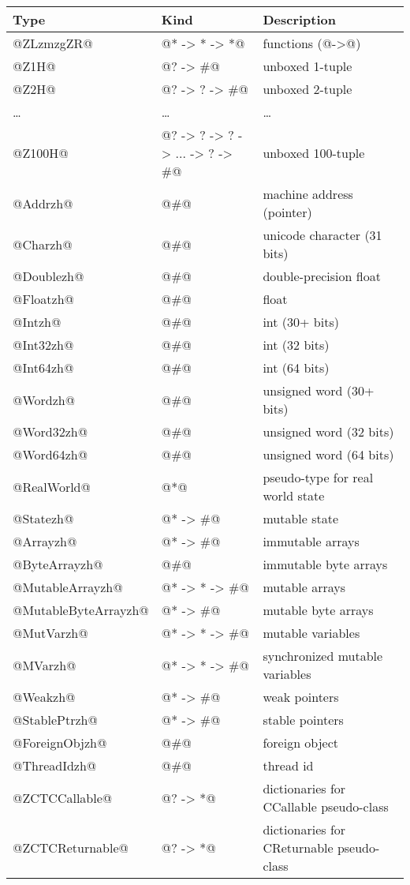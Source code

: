 \documentclass[10pt]{article}
\begin{document}
\begin{tabular}{|l|l|l|}
\hline
Type & Kind & Description \\
\hline
@ZLzmzgZR@ & @* -> * -> *@ & functions (@->@) \\
@Z1H@ & @? -> #@    & unboxed 1-tuple \\
@Z2H@	   & @? -> ? -> #@ & unboxed 2-tuple \\
\ldots   & \ldots & \ldots \\
@Z100H@	   & @? -> ? -> ? -> ... -> ? -> #@ & unboxed 100-tuple \\
@Addrzh@    & @#@	   & machine address (pointer) \\
@Charzh@	   & @#@	   & unicode character (31 bits) \\
@Doublezh@  & @#@	   & double-precision float \\
@Floatzh@   & @#@	   & float \\
@Intzh@	   & @#@	   & int (30+ bits) \\
@Int32zh@   & @#@	   & int (32 bits) \\
@Int64zh@   & @#@	   & int (64 bits) \\
@Wordzh@	   & @#@	   & unsigned word (30+ bits) \\
@Word32zh@   & @#@	   & unsigned word (32 bits) \\
@Word64zh@   & @#@	   & unsigned word (64 bits) \\
@RealWorld@ & @*@          & pseudo-type for real world state \\
@Statezh@    & @* -> #@     & mutable state \\
@Arrayzh@   & @* -> #@     & immutable arrays \\
@ByteArrayzh@   & @#@     & immutable byte arrays \\
@MutableArrayzh@   & @* -> * -> #@     & mutable arrays \\
@MutableByteArrayzh@   & @* -> #@     & mutable byte arrays \\
@MutVarzh@ & @* -> * -> #@  & mutable variables \\
@MVarzh@  & @* -> * -> #@  & synchronized mutable variables \\
@Weakzh@  & @* -> #@      & weak pointers \\
@StablePtrzh@ & @* -> #@  & stable pointers \\
@ForeignObjzh@ & @#@	& foreign object \\
@ThreadIdzh@ & @#@	 & thread id \\
@ZCTCCallable@ & @? -> *@ & dictionaries for CCallable pseudo-class \\
@ZCTCReturnable@ & @? -> *@ & dictionaries for CReturnable pseudo-class \\
\hline
\end{tabular}
\end{document}
